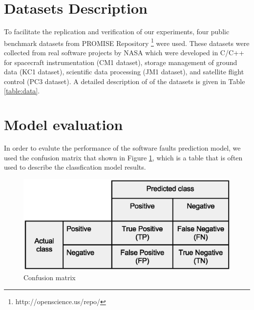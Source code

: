 \documentclass[runningheads,a4paper]{llncs}
\begin{document}
\begin{table}[H]
\caption{Datasets Description}
\begin{centering}
\par\end{centering}
\label{table:data}
\end{table}

\section{Datasets Description}
\label{data}
To facilitate the replication and verification of our experiments, four public benchmark datasets \cite{data6464273} from PROMISE Repository \footnote{http://openscience.us/repo/} were used. These datasets were collected from real software projects by NASA which were developed in C/C++ for spacecraft instrumentation (CM1 dataset), storage management of ground data (KC1 dataset), scientific data processing (JM1 dataset), and satellite flight control (PC3 dataset). A detailed description of of the datasets is given in Table \ref{table:data}.



\section{Model evaluation}
\label{evaluation_criteria}
In order to evalute the performance of the software faults prediction model, we used the confusion matrix that shown in Figure \ref{fig:confusion}, which is a table that is often used to describe the classfication model results. 

\begin{figure}[H]
\centering
\includegraphics[scale=0.5]{confusion-matrix.eps}
\caption{Confusion matrix}
\label{fig:confusion}
\end{figure}
\end{document}
